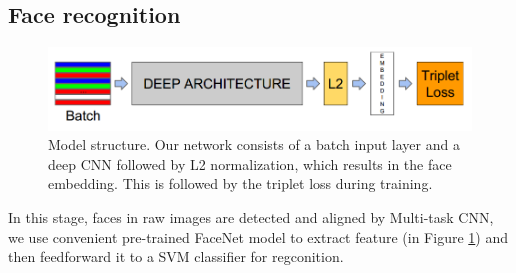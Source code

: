 \documentclass[journal, twocolumn]{IEEEtran}
\begin{document}
\subsection{Face recognition}
\label{face-recognition}
\begin{figure}
    \centering
    \includegraphics[width=1\linewidth]{img/pipeline.png}
	\caption{Model structure. Our network consists of a batch input layer and a deep CNN 
followed by L2 normalization, which results in the face embedding. This is followed by the triplet loss during training.}\label{fig:pipeline}
\end{figure}

In this stage, faces in raw images are detected and aligned by Multi-task CNN, we use convenient pre-trained FaceNet model to extract feature (in Figure \ref{fig:pipeline}) and then feedforward it to a SVM classifier for regconition. 


\end{document}

